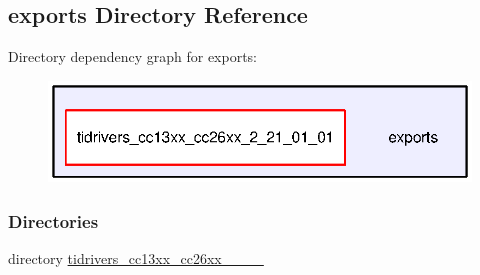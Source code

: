 \subsection{exports Directory Reference}
\label{dir_c17777783ce38a5c07940aaaf742f522}
Directory dependency graph for exports\+:
\nopagebreak
\begin{figure}[H]
\begin{center}
\leavevmode
\includegraphics[width=325pt]{dir_c17777783ce38a5c07940aaaf742f522_dep}
\end{center}
\end{figure}
\subsubsection*{Directories}
\begin{DoxyCompactItemize}
\item 
directory \hyperlink{dir_f6e916242039e0349c75a086e347d29e}{tidrivers\+\_\+cc13xx\+\_\+cc26xx\+\_\+\_\+\_\+\_}
\end{DoxyCompactItemize}
